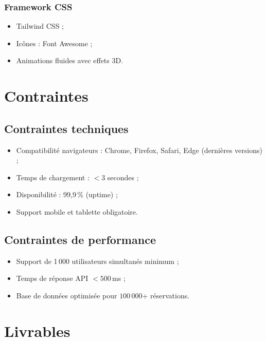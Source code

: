 \documentclass[12pt,a4paper]{report}
\begin{document}
\subsection{Framework CSS}

\begin{itemize}
  \item Tailwind CSS ;
  \item Icônes : Font Awesome ;
  \item Animations fluides avec effets 3D.
\end{itemize}

\chapter{Contraintes}

\section{Contraintes techniques}

\begin{itemize}
  \item Compatibilité navigateurs : Chrome, Firefox, Safari, Edge (dernières versions) ;
  \item Temps de chargement : $< 3$ secondes ;
  \item Disponibilité : 99,9\,\% (uptime) ;
  \item Support mobile et tablette obligatoire.
\end{itemize}

\section{Contraintes de performance}

\begin{itemize}
  \item Support de 1\,000 utilisateurs simultanés minimum ;
  \item Temps de réponse API $< 500$\,ms ;
  \item Base de données optimisée pour $100\,000$+ réservations.
\end{itemize}

\chapter{Livrables}
\end{document}
